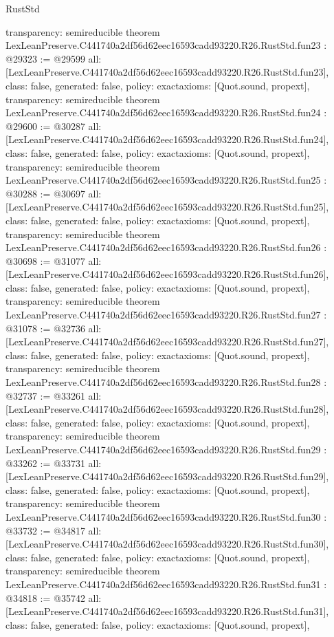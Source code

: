 \begin{lexlean}{RustStd}
\begin{coremodule}
{  transparency: semireducible
}
theorem LexLeanPreserve.C441740a2df56d62eec16593cadd93220.R26.RustStd.fun23 : @29323 := @29599 {
  all: [LexLeanPreserve.C441740a2df56d62eec16593cadd93220.R26.RustStd.fun23],
  class: false,
  generated: false,
  policy: exact{axioms: [Quot.sound, propext]},
  transparency: semireducible
}
theorem LexLeanPreserve.C441740a2df56d62eec16593cadd93220.R26.RustStd.fun24 : @29600 := @30287 {
  all: [LexLeanPreserve.C441740a2df56d62eec16593cadd93220.R26.RustStd.fun24],
  class: false,
  generated: false,
  policy: exact{axioms: [Quot.sound, propext]},
  transparency: semireducible
}
theorem LexLeanPreserve.C441740a2df56d62eec16593cadd93220.R26.RustStd.fun25 : @30288 := @30697 {
  all: [LexLeanPreserve.C441740a2df56d62eec16593cadd93220.R26.RustStd.fun25],
  class: false,
  generated: false,
  policy: exact{axioms: [Quot.sound, propext]},
  transparency: semireducible
}
theorem LexLeanPreserve.C441740a2df56d62eec16593cadd93220.R26.RustStd.fun26 : @30698 := @31077 {
  all: [LexLeanPreserve.C441740a2df56d62eec16593cadd93220.R26.RustStd.fun26],
  class: false,
  generated: false,
  policy: exact{axioms: [Quot.sound, propext]},
  transparency: semireducible
}
theorem LexLeanPreserve.C441740a2df56d62eec16593cadd93220.R26.RustStd.fun27 : @31078 := @32736 {
  all: [LexLeanPreserve.C441740a2df56d62eec16593cadd93220.R26.RustStd.fun27],
  class: false,
  generated: false,
  policy: exact{axioms: [Quot.sound, propext]},
  transparency: semireducible
}
theorem LexLeanPreserve.C441740a2df56d62eec16593cadd93220.R26.RustStd.fun28 : @32737 := @33261 {
  all: [LexLeanPreserve.C441740a2df56d62eec16593cadd93220.R26.RustStd.fun28],
  class: false,
  generated: false,
  policy: exact{axioms: [Quot.sound, propext]},
  transparency: semireducible
}
theorem LexLeanPreserve.C441740a2df56d62eec16593cadd93220.R26.RustStd.fun29 : @33262 := @33731 {
  all: [LexLeanPreserve.C441740a2df56d62eec16593cadd93220.R26.RustStd.fun29],
  class: false,
  generated: false,
  policy: exact{axioms: [Quot.sound, propext]},
  transparency: semireducible
}
theorem LexLeanPreserve.C441740a2df56d62eec16593cadd93220.R26.RustStd.fun30 : @33732 := @34817 {
  all: [LexLeanPreserve.C441740a2df56d62eec16593cadd93220.R26.RustStd.fun30],
  class: false,
  generated: false,
  policy: exact{axioms: [Quot.sound, propext]},
  transparency: semireducible
}
theorem LexLeanPreserve.C441740a2df56d62eec16593cadd93220.R26.RustStd.fun31 : @34818 := @35742 {
  all: [LexLeanPreserve.C441740a2df56d62eec16593cadd93220.R26.RustStd.fun31],
  class: false,
  generated: false,
  policy: exact{axioms: [Quot.sound, propext]},
}
\end{coremodule}
\end{lexlean}
